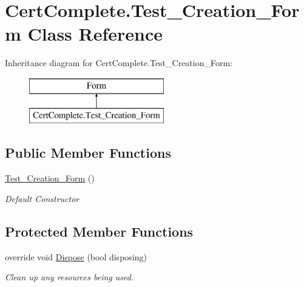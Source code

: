 \hypertarget{class_cert_complete_1_1_test___creation___form}{}\section{Cert\+Complete.\+Test\+\_\+\+Creation\+\_\+\+Form Class Reference}
\label{class_cert_complete_1_1_test___creation___form}
Inheritance diagram for Cert\+Complete.\+Test\+\_\+\+Creation\+\_\+\+Form\+:\begin{figure}[H]
\begin{center}
\leavevmode
\includegraphics[height=2.000000cm]{class_cert_complete_1_1_test___creation___form}
\end{center}
\end{figure}
\subsection*{Public Member Functions}
\begin{DoxyCompactItemize}
\item 
\mbox{\hyperlink{class_cert_complete_1_1_test___creation___form_af45433ebdfd93d2ad6bedd97e2cdf3de}{Test\+\_\+\+Creation\+\_\+\+Form}} ()
\begin{DoxyCompactList}\small\item\em Default Constructor \end{DoxyCompactList}\end{DoxyCompactItemize}
\subsection*{Protected Member Functions}
\begin{DoxyCompactItemize}
\item 
override void \mbox{\hyperlink{class_cert_complete_1_1_test___creation___form_a47868c8a9f31e352fe7c15d339ff26de}{Dispose}} (bool disposing)
\begin{DoxyCompactList}\small\item\em Clean up any resources being used. \end{DoxyCompactList}\end{DoxyCompactItemize}
